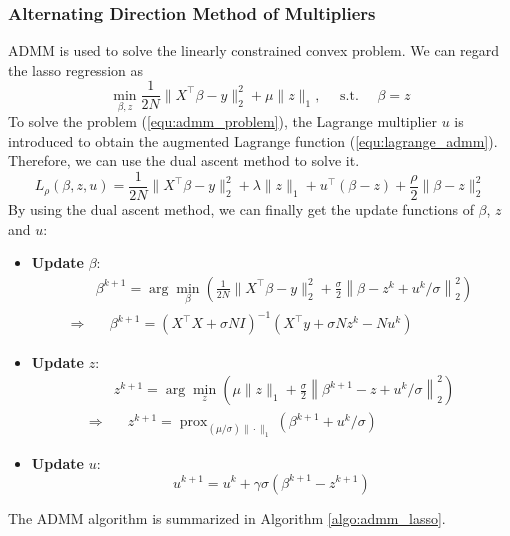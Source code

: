 \documentclass[11pt,en,authoryear]{elegantpaper}
\numberwithin{equation}{section}
\begin{document}
\subsubsection{Alternating Direction Method of Multipliers}

ADMM is used to solve the linearly constrained convex problem. We can regard the lasso regression as
\begin{equation}\label{equ:admm_problem}
\min _{\beta, z} \frac{1}{2N}\|X^{\top}\beta-y\|_{2}^{2}+\mu\|z\|_{1}, \quad \text { s.t. } \quad \beta=z
\end{equation}
To solve the problem (\ref{equ:admm_problem}), the Lagrange multiplier $u$ is introduced to obtain the augmented Lagrange function (\ref{equ:lagrange_admm}). Therefore, we can use the dual ascent method to solve it.
\begin{equation}\label{equ:lagrange_admm}
L_{\rho}(\beta, z, u)=\frac{1}{2N}\|X^{\top} \beta-y\|_{2}^{2}+\lambda\|z\|_{1}+u^{\top}(\beta-z)+\frac{\rho}{2}\|\beta-z\|_{2}^{2}
\end{equation}
By using the dual ascent method, we can finally get the update functions of $\beta$, $z$ and $u$:
\begin{itemize}
    \item \textbf{Update} $\beta$:
    \begin{equation}\label{equ:update_beta}
    \begin{aligned}
    &\beta^{k+1}=\arg \min _{\beta}\left(\frac{1}{2N}\|X^{\top} \beta-y\|_{2}^{2}+\frac{\sigma}{2}\left\|\beta-z^{k}+u^{k} / \sigma\right\|_{2}^{2}\right)\\
    \Rightarrow & \quad \beta^{k+1}=\left(X^{\top} X+\sigma N I\right)^{-1}\left(X^{\top} y+\sigma N z^{k}- N u^{k}\right)
    \end{aligned}
    \end{equation}
    \item \textbf{Update} $z$:
    \begin{equation}\label{equ:update_z}
    \begin{aligned}
    &z^{k+1}=\arg \min _{z}\left(\mu\|z\|_{1}+\frac{\sigma}{2}\left\|{\beta}^{k+1}-z+u^{k} / \sigma\right\|_{2}^{2}\right)\\
    \Rightarrow & \quad z^{k+1}=\operatorname{prox}_{(\mu / \sigma)\|\cdot\|_{1}}\left({\beta}^{k+1}+u^{k} / \sigma\right)
    \end{aligned}
    \end{equation}
    \item \textbf{Update} $u$:
    \begin{equation}\label{equ:update_u}
    u^{k+1}=u^{k}+\gamma \sigma\left({\beta}^{k+1}-z^{k+1}\right)
    \end{equation}
\end{itemize}
The ADMM algorithm is summarized in Algorithm \ref{algo:admm_lasso}.
\end{document}
